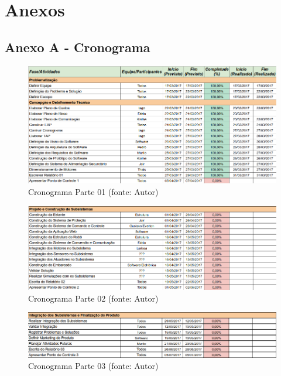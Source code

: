 \chapter[Anexos]{Anexos}
\section{Anexo A - Cronograma}

\begin{figure}[!h]
\centering
\includegraphics[scale=0.50, angle = 360]{figuras/cronograma1}
\caption[]{Cronograma Parte 01 (fonte: Autor)}
\label{Cronograma Parte 01}
\end{figure}
\FloatBarrier

\begin{figure}[!h]
\centering
\includegraphics[scale=0.50, angle = 360]{figuras/cronograma2}
\caption[]{Cronograma Parte 02 (fonte: Autor)}
\label{Cronograma Parte 02}
\end{figure}
\FloatBarrier

\begin{figure}[!h]
\centering
\includegraphics[scale=0.50, angle = 360]{figuras/cronograma3}
\caption[]{Cronograma Parte 03 (fonte: Autor)}
\label{Cronograma Parte 03}
\end{figure}
\FloatBarrier


